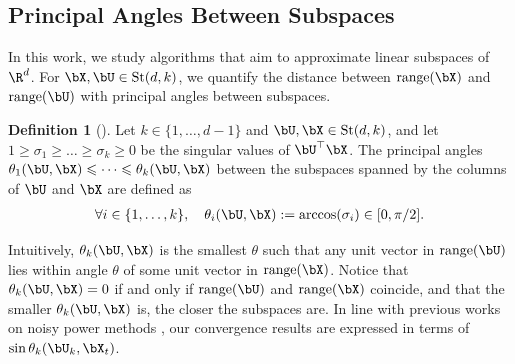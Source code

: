 \documentclass{article}
\theoremstyle{plain}
\newtheorem{proposition}[theorem]{Proposition}
\theoremstyle{definition}
\newtheorem{definition}[theorem]{Definition}
\theoremstyle{remark}
\begin{document}
\subsection{Principal Angles Between Subspaces}


In this work, we study algorithms that aim to approximate linear subspaces of $\R^d$. For $\bX,\bU \in \mathrm{St}(d,k)$, we quantify the distance between $\mathrm{range}(\bX)$ and $\mathrm{range}(\bU)$ with principal angles between subspaces.

\begin{definition}[\citet{knyazev02}]
  Let $k \in \{1,\dots,d-1\}$ and $\bU, \bX \in \mathrm{St}(d,k)$, and let $1 \geqslant \sigma_1 \geqslant \dots \geqslant \sigma_k \geqslant 0$ be the singular values of $\bU^\top \bX$. The principal angles $\theta_1(\bU, \bX) \leqslant \dots \leqslant \theta_k(\bU, \bX)$ between the subspaces spanned by the columns of $\bU$ and $\bX$ are defined as
  \begin{align*}
    \forall i \in \{1,\dots,k\}, \quad \theta_i(\bU, \bX) := \arccos(\sigma_i) \in [0, \pi/2].
  \end{align*}
\end{definition}

Intuitively, $\theta_k(\bU,\bX)$ is the smallest $\theta$ such that any unit vector in $\mathrm{range}(\bU)$ lies within angle $\theta$ of some unit vector in $\mathrm{range}(\bX)$. Notice that $\theta_k(\bU,\bX) = 0$ if and only if $\mathrm{range}(\bU)$ and $\mathrm{range}(\bX)$ coincide, and that the smaller $\theta_k(\bU,\bX)$ is, the closer the subspaces are. In line with previous works on noisy power methods \cite{hardt14,balcan2016,xu2023anpm}, our convergence results are expressed in terms of $\sin\theta_k(\bU_k, \bX_t)$.%


\end{document}
